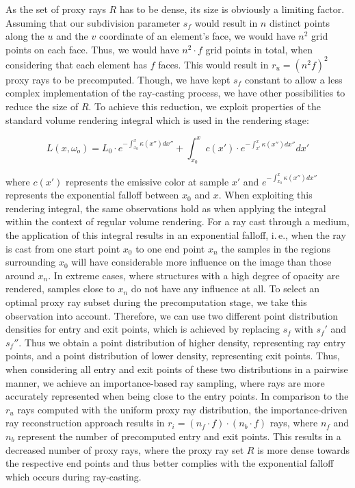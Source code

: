 \documentclass[review,journal]{vgtc}         %
\begin{document}
As the set of proxy rays $R$ has to be dense, its size is obviously a limiting factor. Assuming that our subdivision parameter $s_f$ would result in $n$ distinct points along the $u$ and the $v$ coordinate of an element's face, we would have $n^2$ grid points on each face. Thus, we would have $n^2 \cdot f$ grid points in total, when considering that each element has $f$ faces. This would result in $r_u = (n^2 f)^2$ proxy rays to be precomputed. Though, we have kept $s_f$ constant to allow a less complex implementation of the ray-casting process, we have other possibilities to reduce the size of $R$. To achieve this reduction, we exploit properties of the standard volume rendering integral which is used in the rendering stage:

$$ L(x,\omega_o) = L_0 \cdot e^{-\int_{x_0}^{x}\kappa(x'')dx''} + \int_{x_0}^{x}  \! c(x') \cdot e^{-\int_{x'}^{x}\kappa(x'')dx''} dx'$$

\noindent where $c(x')$ represents the emissive color at sample $x'$ and $e^{-\int_{x_0}^{x}\kappa(x'')dx''}$ represents the exponential falloff between $x_0$ and $x$. When exploiting this rendering integral, the same observations hold as when applying the integral within the context of regular volume rendering. For a ray cast through a medium, the application of this integral results in an exponential falloff, i.\,e., when the ray is cast from one start point $x_0$ to one end point $x_n$ the samples in the regions surrounding $x_0$ will have considerable more influence on the image than those around $x_n$. In extreme cases, where structures with a high degree of opacity are rendered, samples close to $x_n$ do not have any influence at all. To select an optimal proxy ray subset during the precomputation stage, we take this observation into account. Therefore, we can use two different point distribution densities for entry and exit points, which is achieved by replacing $s_f$ with $s_f'$ and $s_f''$. Thus we obtain a point distribution of higher density, representing ray entry points, and a point distribution of lower density, representing exit points. Thus, when considering all entry and exit points of these two distributions in a pairwise manner, we achieve an importance-based ray sampling, where rays are more accurately represented when being close to the entry points. In comparison to the $r_u$ rays computed with the uniform proxy ray distribution, the importance-driven ray reconstruction approach results in $r_i = (n_{f} \cdot f) \cdot (n_{b} \cdot f)$ rays, where $n_{f}$ and $n_{b}$ represent the number of precomputed entry and exit points. This results in a decreased number of proxy rays, where the proxy ray set $R$ is more dense towards the respective end points and thus better complies with the exponential falloff which occurs during ray-casting.
\end{document}
